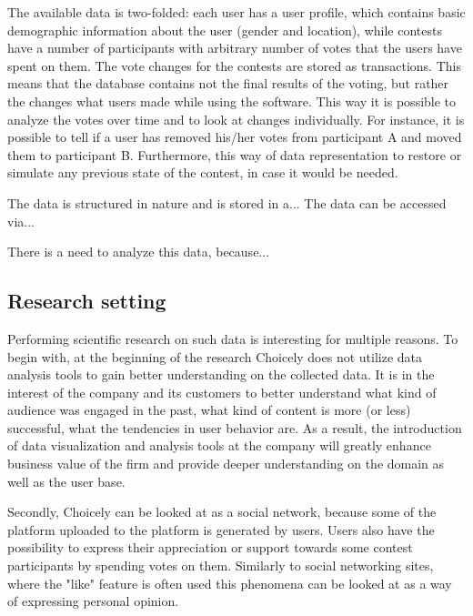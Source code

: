     The available data is two-folded: each user has a user profile, which contains basic demographic information about the user (gender and location), while contests have a number of participants with arbitrary number of votes that the users have spent on them. The vote changes for the contests are stored as transactions. This means that the database contains not the final results of the voting, but rather the changes what users made while using the software. This way it is possible to analyze the votes over time and to look at changes individually. For instance, it is possible to tell if a user has removed his/her votes from participant A and moved them to participant B. Furthermore, this way of data representation to restore or simulate any previous state of the contest, in case it would be needed.

    The data is structured in nature and is stored in a... The data can be accessed via...

    There is a need to analyze this data, because...
    
\subsection{Research setting}
    Performing scientific research on such data is interesting for multiple reasons. To begin with, at the beginning of the research Choicely does not utilize data analysis tools to gain better understanding on the collected data. It is in the interest of the company and its customers to better understand what kind of audience was engaged in the past, what kind of content is more (or less) successful, what the tendencies in user behavior are. As a result, the introduction of data visualization and analysis tools at the company will greatly enhance business value of the firm and provide deeper understanding on the domain as well as the user base.   
    
    Secondly, Choicely can be looked at as a social network, because some of the platform uploaded to the platform is generated by users. Users also have the possibility to express their appreciation or support towards some contest participants by spending votes on them. Similarly to social networking sites, where the "like" feature is often used \cite{jang2015noreciprocity, bakhshi2014faces} this phenomena can be looked at as a way of expressing personal opinion. 
    
